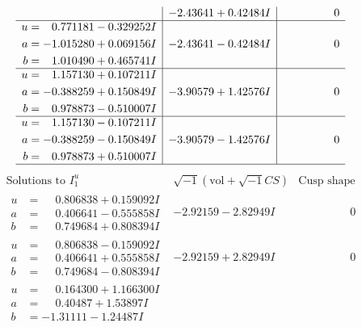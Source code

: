 \documentclass[1p]{elsarticle_modified}
\theoremstyle{definition}
\newcommand{\I}{\sqrt{-1}}
\begin{document}
$$\begin{array}{c|c|c}
 & -2.43641 + 0.42484 I & \phantom{-0.000000 } 0 \\ \hline\begin{aligned}
u &= \phantom{-}0.771181 - 0.329252 I \\
a &= -1.015280 + 0.069156 I \\
b &= \phantom{-}1.010490 + 0.465741 I\end{aligned}
 & -2.43641 - 0.42484 I & \phantom{-0.000000 } 0 \\ \hline\begin{aligned}
u &= \phantom{-}1.157130 + 0.107211 I \\
a &= -0.388259 + 0.150849 I \\
b &= \phantom{-}0.978873 - 0.510007 I\end{aligned}
 & -3.90579 + 1.42576 I & \phantom{-0.000000 } 0 \\ \hline\begin{aligned}
u &= \phantom{-}1.157130 - 0.107211 I \\
a &= -0.388259 - 0.150849 I \\
b &= \phantom{-}0.978873 + 0.510007 I\end{aligned}
 & -3.90579 - 1.42576 I & \phantom{-0.000000 } 0\\
 \hline 
 \end{array}$$\newpage$$\begin{array}{c|c|c}  
\text{Solutions to }I^u_{1}& \I (\text{vol} + \sqrt{-1}CS) & \text{Cusp shape}\\
 \hline 
\begin{aligned}
u &= \phantom{-}0.806838 + 0.159092 I \\
a &= \phantom{-}0.406641 - 0.555858 I \\
b &= \phantom{-}0.749684 + 0.808394 I\end{aligned}
 & -2.92159 - 2.82949 I & \phantom{-0.000000 } 0 \\ \hline\begin{aligned}
u &= \phantom{-}0.806838 - 0.159092 I \\
a &= \phantom{-}0.406641 + 0.555858 I \\
b &= \phantom{-}0.749684 - 0.808394 I\end{aligned}
 & -2.92159 + 2.82949 I & \phantom{-0.000000 } 0 \\ \hline\begin{aligned}
u &= \phantom{-}0.164300 + 1.166300 I \\
a &= \phantom{-}0.40487 + 1.53897 I \\
b &= -1.31111 - 1.24487 I\end{aligned}

\end{array}$$
\end{document}
